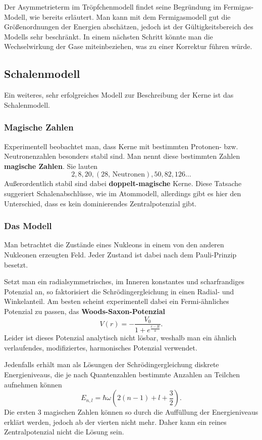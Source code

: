 Der Asymmetrieterm im Tröpfchenmodell findet seine Begründung im Fermigas-Modell, wie bereits erläutert.
Man kann mit dem Fermigasmodell gut die Größenordnungen der Energien abschätzen, jedoch ist der Gültigkeitsbereich des Modells sehr beschränkt.
In einem nächsten Schritt könnte man die Wechselwirkung der Gase miteinbeziehen, was zu einer Korrektur führen würde.

\subsection{Schalenmodell}
Ein weiteres, sehr erfolgreiches Modell zur Beschreibung der Kerne ist das Schalenmodell.

\subsubsection{Magische Zahlen}
Experimentell beobachtet man, dass Kerne mit bestimmten Protonen- bzw. Neutronenzahlen besonders stabil sind.
Man nennt diese bestimmten Zahlen \textbf{magische Zahlen}.
Sie lauten
\begin{equation*}
	2, 8, 20, (28\text{, Neutronen}), 50, 82, 126 \dots
\end{equation*}
Außerordentlich stabil sind dabei \textbf{doppelt-magische} Kerne.
Diese Tatsache suggeriert Schalenabschlüsse, wie im Atommodell, allerdings gibt es hier den Unterschied, dass es kein dominierendes Zentralpotenzial gibt.

\subsubsection{Das Modell}
Man betrachtet die Zustände eines Nukleons in einem von den anderen Nukleonen erzeugten Feld.
Jeder Zustand ist dabei nach dem Pauli-Prinzip besetzt.

Setzt man ein radialsymmetrisches, im Inneren konstantes und scharfrandiges Potenzial an, so faktorisiert die Schrödingergleichung in einen Radial- und Winkelanteil.
Am besten scheint experimentell dabei ein Fermi-ähnliches Potenzial zu passen, das \textbf{Woods-Saxon-Potenzial}
\begin{equation*}
	V(r) = -\frac{V_0}{1+e^\frac{r-R}{a}}.
\end{equation*}
Leider ist dieses Potenzial analytisch nicht lösbar, weshalb man ein ähnlich verlaufendes, modifiziertes, harmonisches Potenzial verwendet.

Jedenfalls erhält man als Lösungen der Schrödingergleichung diskrete Energieniveaus, die je nach Quantenzahlen bestimmte Anzahlen an Teilchen aufnehmen können
\begin{equation}\label{eq:eniveaus}
	E_{n,l} = \hbar\omega\left(2(n-1) + l + \frac{3}{2}\right).
\end{equation}
Die ersten 3 magischen Zahlen können so durch die Auffüllung der Energieniveaus erklärt werden, jedoch ab der vierten nicht mehr.
Daher kann ein reines Zentralpotenzial nicht die Lösung sein.

